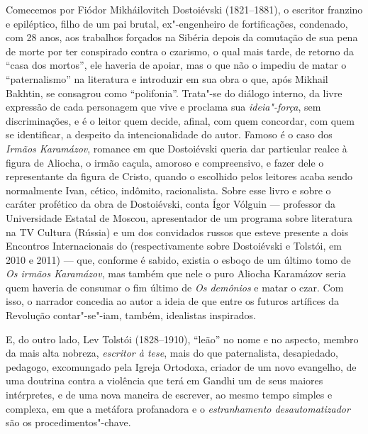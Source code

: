Comecemos por Fiódor Mikháilovitch Dostoiévski (1821--1881), o
escritor franzino e epiléptico, filho de um pai brutal,
ex"-engenheiro de fortificações, condenado, com 28 anos, aos
trabalhos forçados na Sibéria depois da comutação de sua pena de
morte por ter conspirado contra o czarismo, o qual mais tarde,
de retorno da ``casa dos mortos'', ele haveria de apoiar, mas o
que não o impediu de matar o ``paternalismo'' na literatura e
introduzir em sua obra o que, após Mikhail Bakhtin, se consagrou
como ``polifonia''. Trata"-se do diálogo interno, da livre
expressão de cada personagem que vive e proclama sua
\emph{ideia"-força}, sem discriminações, e é o leitor quem
decide, afinal, com quem concordar, com quem se identificar, a
despeito da intencionalidade do autor. Famoso é o caso dos
\emph{Irmãos Karamázov}, romance em que Dostoiévski queria
dar particular realce à figura de Aliocha, o irmão caçula,
amoroso e compreensivo, e fazer dele o representante da figura
de Cristo, quando o escolhido pelos leitores acaba sendo
normalmente Ivan, cético, indômito, racionalista. Sobre esse
livro e sobre o caráter profético da obra de Dostoiévski, conta
Ígor Vólguin --- professor da Universidade Estatal de Moscou,
apresentador de um programa sobre literatura na TV Cultura
(Rússia) e um dos convidados russos que esteve presente a dois
Encontros Internacionais do  (respectivamente sobre
Dostoiévski e Tolstói, em 2010 e 2011) --- que, conforme é sabido,
existia o esboço de um último tomo de \emph{Os irmãos Karamázov},
mas também que nele o puro Aliocha Karamázov seria quem haveria
de consumar o fim último de \emph{Os demônios} e matar o czar.
Com isso, o narrador concedia ao autor a ideia de que entre os
futuros artífices da Revolução contar"-se"-iam, também,
idealistas inspirados.

E, do outro lado, Lev Tolstói (1828--1910), ``leão'' no nome e
no aspecto, membro da mais alta nobreza, \emph{escritor à tese},
mais do que paternalista, desapiedado, pedagogo, excomungado pela
Igreja Ortodoxa, criador de um novo evangelho, de uma doutrina
contra a violência que terá em Gandhi um de seus maiores
intérpretes, e de uma nova maneira de escrever, ao mesmo
tempo simples e complexa, em que a metáfora profanadora e o
\emph{estranhamento desautomatizador} são os procedimentos"-chave.

